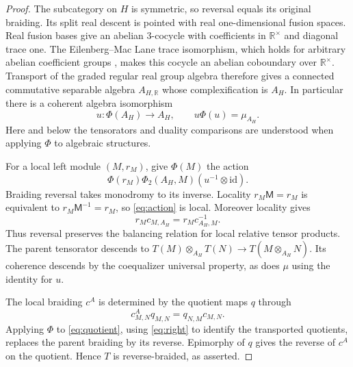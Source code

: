 \documentclass[11pt]{amsart}
\theoremstyle{remark}
\newcommand{\R}{\mathbb R}
\begin{document}
\begin{proof}
The subcategory on $H$ is symmetric, so reversal equals its original
braiding. Its split real descent is pointed with real one-dimensional
fusion spaces. Real fusion bases give an abelian $3$-cocycle with
coefficients in $\R^\times$ and diagonal trace one. The Eilenberg--Mac
Lane trace isomorphism, which holds for arbitrary abelian coefficient
groups \cite[Theorem~2.4]{Braunling}, makes this cocycle an abelian
coboundary over $\R^\times$. Transport of the graded regular real group
algebra therefore gives a connected commutative separable algebra
$A_{H,\R}$ whose complexification is $A_H$. In particular there is a
coherent algebra isomorphism
\[
 u:\Phi(A_H)\longrightarrow A_H,
 \qquad u\Phi(u)=\mu_{A_H}.
\]
Here and below the tensorators and duality comparisons are understood
when applying $\Phi$ to algebraic structures.

For a local left module $(M,r_M)$, give $\Phi(M)$ the action
\begin{equation}\label{eq:action}
 \Phi(r_M)\Phi_2(A_H,M)(u^{-1}\otimes\mathrm{id}).
\end{equation}
Braiding reversal takes monodromy to its inverse. Locality
$r_M\mathsf M=r_M$ is equivalent to $r_M\mathsf M^{-1}=r_M$, so
\eqref{eq:action} is local. Moreover locality gives
\begin{equation}\label{eq:right}
 r_Mc_{M,A_H}=r_Mc_{A_H,M}^{-1}.
\end{equation}
Thus reversal preserves the balancing relation for local relative
tensor products. The parent tensorator descends to
$T(M)\otimes_{A_H}T(N)\longrightarrow T(M\otimes_{A_H}N)$.
Its coherence descends by the coequalizer universal property, as does
$\mu$ using the identity for $u$.

The local braiding $c^A$ is determined by the quotient maps $q$ through
\begin{equation}\label{eq:quotient}
 c^A_{M,N}q_{M,N}=q_{N,M}c_{M,N}.
\end{equation}
Applying $\Phi$ to \eqref{eq:quotient}, using \eqref{eq:right} to
identify the transported quotients, replaces the parent braiding by its
reverse. Epimorphy of $q$ gives the reverse of $c^A$ on the quotient.
Hence $T$ is reverse-braided, as asserted.


\end{proof}
\end{document}
